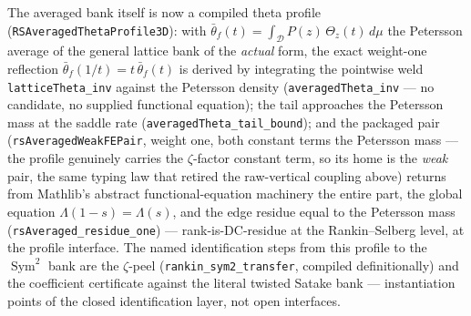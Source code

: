 \documentclass[11pt]{article}
\theoremstyle{definition}
\newcommand{\Sym}{\operatorname{Sym}}
\begin{document}
\noindent The averaged bank itself is now a compiled theta profile
(\texttt{RSAveragedThetaProfile3D}): with
$\bar\theta_f(t)=\int_{\mathcal D}P(z)\,\Theta_z(t)\,d\mu$ the Petersson average of the general
lattice bank of the \emph{actual} form, the exact weight-one reflection
$\bar\theta_f(1/t)=t\,\bar\theta_f(t)$ is derived by integrating the pointwise weld
\texttt{latticeTheta\_inv} against the Petersson density (\texttt{averagedTheta\_inv} --- no
candidate, no supplied functional equation); the tail approaches the Petersson mass at the
saddle rate (\texttt{averagedTheta\_tail\_bound}); and the packaged pair
(\texttt{rsAveragedWeakFEPair}, weight one, both constant terms the Petersson mass --- the
profile genuinely carries the $\zeta$-factor constant term, so its home is the \emph{weak} pair,
the same typing law that retired the raw-vertical coupling above) returns from Mathlib's
abstract functional-equation machinery the entire part, the global equation
$\Lambda(1-s)=\Lambda(s)$, and the edge residue equal to the Petersson mass
(\texttt{rsAveraged\_residue\_one}) --- rank-is-DC-residue at the Rankin--Selberg level, at the
profile interface.  The named identification steps from this profile to the $\Sym^2$ bank are
the $\zeta$-peel (\texttt{rankin\_sym2\_transfer}, compiled definitionally) and the coefficient
certificate against the literal twisted Satake bank --- instantiation points of the closed
identification layer, not open interfaces.
\end{document}
